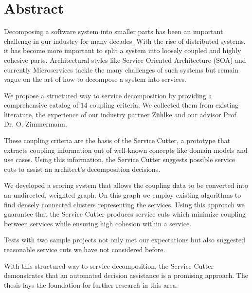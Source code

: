 \chapter{Abstract}

Decomposing a software system into smaller parts has been an important challenge in our industry for many decades. With the rise of distributed systems, it has become more important to split a system into loosely coupled and highly cohesive parts. Architectural styles like Service Oriented Architecture (SOA) and currently Microservices tackle the many challenges of such systems but remain vague on the art of how to decompose a system into services.

We propose a structured way to service decomposition by providing a comprehensive catalog of 14 coupling criteria. We collected them from existing literature, the experience of our industry partner Zühlke and our advisor Prof. Dr. O. Zimmermann.

These coupling criteria are the basis of the Service Cutter, a prototype that extracts coupling information out of well-known concepts like domain models and use cases. Using this information, the Service Cutter suggests possible service cuts to assist an architect’s decomposition decisions. 

We developed a scoring system that allows the coupling data to be converted into an undirected, weighted graph. On this graph we employ existing algorithms to find densely connected clusters representing the services. Using this approach we guarantee that the Service Cutter produces service cuts which minimize coupling between services while ensuring high cohesion within a service. 

Tests with two sample projects not only met our expectations but also suggested reasonable service cuts we have not considered before. 

With this structured way to service decomposition, the Service Cutter demonstrates that an automated decision assistance is a promising approach. The thesis lays the foundation for further research in this area. 
